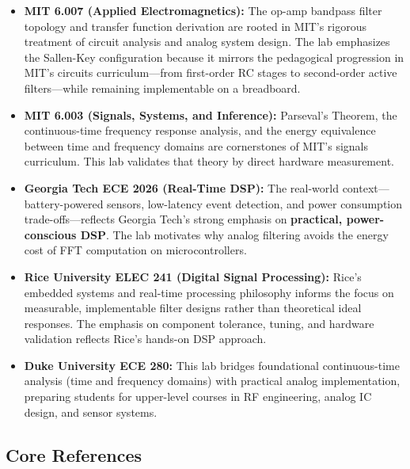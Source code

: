 \documentclass[11pt,letterpaper]{article}
\begin{document}
\begin{itemize}
    \item \textbf{MIT 6.007 (Applied Electromagnetics):} The op-amp bandpass filter topology and transfer function derivation are rooted in MIT's rigorous treatment of circuit analysis and analog system design. The lab emphasizes the Sallen-Key configuration because it mirrors the pedagogical progression in MIT's circuits curriculum—from first-order RC stages to second-order active filters—while remaining implementable on a breadboard.

    \item \textbf{MIT 6.003 (Signals, Systems, and Inference):} Parseval's Theorem, the continuous-time frequency response analysis, and the energy equivalence between time and frequency domains are cornerstones of MIT's signals curriculum. This lab validates that theory by direct hardware measurement.

    \item \textbf{Georgia Tech ECE 2026 (Real-Time DSP):} The real-world context—battery-powered sensors, low-latency event detection, and power consumption trade-offs—reflects Georgia Tech's strong emphasis on \textbf{practical, power-conscious DSP}. The lab motivates why analog filtering avoids the energy cost of FFT computation on microcontrollers.

    \item \textbf{Rice University ELEC 241 (Digital Signal Processing):} Rice's embedded systems and real-time processing philosophy informs the focus on measurable, implementable filter designs rather than theoretical ideal responses. The emphasis on component tolerance, tuning, and hardware validation reflects Rice's hands-on DSP approach.

    \item \textbf{Duke University ECE 280:} This lab bridges foundational continuous-time analysis (time and frequency domains) with practical analog implementation, preparing students for upper-level courses in RF engineering, analog IC design, and sensor systems.
\end{itemize}

\subsection*{Core References}
\end{document}
